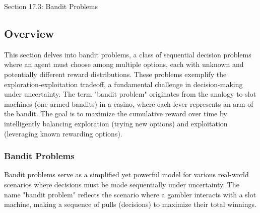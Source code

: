 \begin{notes}{Section 17.3: Bandit Problems}
    \subsection*{Overview}

    This section delves into bandit problems, a class of sequential decision problems where an agent must choose among multiple options, each with unknown and potentially different reward distributions. 
    These problems exemplify the exploration-exploitation tradeoff, a fundamental challenge in decision-making under uncertainty. The term "bandit problem" originates from the analogy to slot machines 
    (one-armed bandits) in a casino, where each lever represents an arm of the bandit. The goal is to maximize the cumulative reward over time by intelligently balancing exploration (trying new options) 
    and exploitation (leveraging known rewarding options).
    
    \subsubsection*{Bandit Problems}
    
    Bandit problems serve as a simplified yet powerful model for various real-world scenarios where decisions must be made sequentially under uncertainty. The name "bandit problem" reflects the 
    scenario where a gambler interacts with a slot machine, making a sequence of pulls (decisions) to maximize their total winnings.
    
    \begin{highlight}
    

\end{highlight}
\end{notes}
